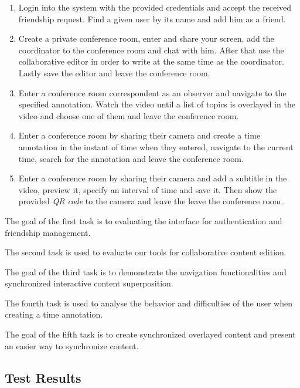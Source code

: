       \begin{enumerate}
      \item Login into the system with the provided credentials and accept the received friendship request. Find a given user by its name and add him as a friend.

      \item Create a private conference room, enter and share your screen, add the coordinator to the conference room and chat with him. After that use the collaborative editor in order to write at the same time as the coordinator. Lastly save the editor and leave the conference room.

      \item Enter a conference room correspondent as an observer and navigate to the specified annotation. Watch the video until a list of topics is overlayed in the video and choose one of them and leave the conference room.

      \item Enter a conference room by sharing their camera and create a time annotation in the instant of time when they entered, navigate to the current time, search for the annotation and leave the conference room.

      \item Enter a conference room by sharing their camera and add a subtitle in the video, preview it, specify an interval of time and save it. Then show the provided \emph{QR code} to the camera and leave the leave the conference room.
      \end{enumerate}

      The goal of the first task is to evaluating the interface for authentication and friendship management.

      The second task is used to evaluate our tools for collaborative content edition.

      The goal of the third task is to demonstrate the navigation functionalities and synchronized interactive content superposition.

      The fourth task is used to analyse the behavior and difficulties of the user when creating a time annotation.

      The goal of the fifth task is to create synchronized overlayed content and present an easier way to synchronize content.

  \subsection{Test Results}

